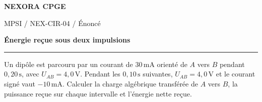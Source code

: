 \documentclass[11pt,a4paper]{article}
\begin{document}
{\small\bfseries\color{nexorablue} NEXORA CPGE}\par
{\small MPSI / NEX-CIR-04 / Énoncé}\par
{\LARGE\bfseries Énergie reçue sous deux impulsions}\par
\vspace{0.25em}\hrule\vspace{0.6em}

Un dipôle est parcouru par un courant de $30\,\mathrm{mA}$ orienté de $A$ vers $B$ pendant $0{,}20\,\mathrm s$, avec $U_{AB}=4{,}0\,\mathrm V$. Pendant les $0{,}10\,\mathrm s$ suivantes, $U_{AB}=4{,}0\,\mathrm V$ et le courant signé vaut $-10\,\mathrm{mA}$. Calculer la charge algébrique transférée de $A$ vers $B$, la puissance reçue sur chaque intervalle et l’énergie nette reçue.
\end{document}
